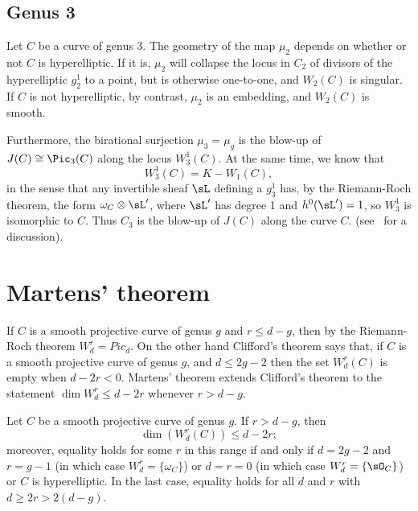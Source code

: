 \subsection{Genus 3}
\begin{fact}
 Let $C$ be a curve of genus 3. The geometry of the map $\mu_2$ depends on whether or not $C$ is hyperelliptic. If it is, $\mu_2$ will collapse the locus in $C_2$ of divisors of the hyperelliptic $g^1_2$ to a point, but is otherwise one-to-one, and $W_2(C)$ is singular.  If $C$ is not hyperelliptic, by contrast, $\mu_2$ is an embedding, and $W_2(C)$ is smooth. 


Furthermore, the birational surjection $\mu_3 = \mu_g$ is the blow-up of $J(C) \cong \Pic_3(C)$ along the locus $W^1_3(C)$. At the same time, we know that
$$
W^1_3(C) = K - W_1(C),
$$
in the sense that any invertible sheaf $\sL$ defining a $g^1_3$ has, by the Riemann-Roch theorem, the form $\omega_C\otimes \sL'$,
where $\sL'$ has degree 1 and $h^0(\sL') = 1$,
so $W^1_3$ is isomorphic to $C$. Thus $C_{3}$ is the blow-up of $J(C)$ along the curve $C$.
(see~\cite[pp. 53--4]{MumfordCJ} for a discussion).
\end{fact}

\section{Martens' theorem}

If $C$ is a smooth projective curve of genus $g$ and $r\leq d-g$, then by the Riemann-Roch theorem
 $W^{r}_{d} = Pic_{d}$. On the other hand
Clifford's theorem says that, if $C$ is a smooth projective curve of genus $g$,  and $d\leq 2g-2$ then the set
 $W^r_d(C)$ is empty when $d-2r<0$. Martens' theorem extends Clifford's theorem to the statement
 $\dim W^r_{d} \leq d-2r$ whenever $r>d-g$.

 
\begin{theorem}\cite{Martens}\label{Martens' inequality}
Let $C$ be a smooth projective curve of genus $g$. If $r > d-g$, then 
$$
\dim(W^r_d(C)) \leq d-2r;
$$
moreover, equality holds for some $r$ in this range if and only if $d=2g-2$ and $r= g-1$ (in which case $W^r_d = \{\omega_C\}$) or
$d=r=0$ (in which case $W^r_d = \{\sO_C\}$) or $C$ is hyperelliptic. In the last case, equality holds for all $d$ and $r$ with $d\geq 2r > 2(d-g)$.
\end{theorem}

